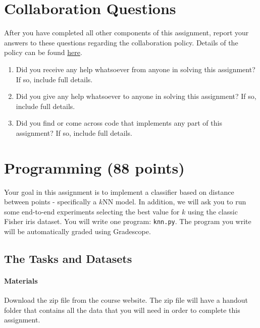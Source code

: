 \documentclass[11pt,addpoints,answers]{exam}
\begin{document}
\begin{questions}
\begin{parts}
    \clearpage
\end{parts}\clearpage
\newpage
\newpage
\section{Collaboration Questions}
After you have completed all other components of this assignment, report your answers to these questions regarding the collaboration policy. Details of the policy can be found \href{http://www.cs.cmu.edu/~mgormley/courses/10601/syllabus.html}{here}.
\begin{enumerate}
    \item Did you receive any help whatsoever from anyone in solving this assignment? If so, include full details.
    \item Did you give any help whatsoever to anyone in solving this assignment? If so, include full details.
    \item Did you find or come across code that implements any part of this assignment? If so, include full details.
\end{enumerate}

\begin{your_solution}[height=6cm]

\end{your_solution}
\newpage
\end{questions}

\section{Programming (88 points)}

Your goal in this assignment is to implement a classifier based on distance between points - specifically a $k$NN model. In addition, we will ask you to run some end-to-end experiments selecting the best value for $k$ using the classic Fisher iris dataset. 
%
You will write one program: \texttt{knn.py}. The program you write will be automatically graded using Gradescope.

\subsection{The Tasks and Datasets}
\label{sec:data}

\paragraph{Materials} Download the zip file from the course website. The zip file will have a handout folder that contains all the data that you will need in order to complete this assignment.
\end{document}
